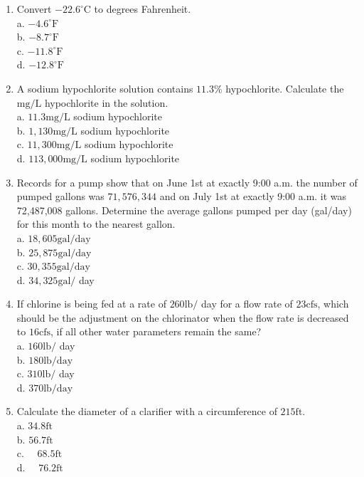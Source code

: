 \documentclass[10pt]{article}
\begin{document}
\begin{enumerate}
  \item Convert $-22.6^{\circ} \mathrm{C}$ to degrees Fahrenheit.\\
a. $-4.6^{\circ} \mathrm{F}$\\
b. $-8.7^{\circ} \mathrm{F}$\\
c. $-11.8^{\circ} \mathrm{F}$\\
d. $-12.8^{\circ} \mathrm{F}$

  \item A sodium hypochlorite solution contains $11.3 \%$ hypochlorite. Calculate the $\mathrm{mg} / \mathrm{L}$ hypochlorite in the solution.\\
a. $11.3 \mathrm{mg} / \mathrm{L}$ sodium hypochlorite\\
b. $1,130 \mathrm{mg} / \mathrm{L}$ sodium hypochlorite\\
c. $11,300 \mathrm{mg} / \mathrm{L}$ sodium hypochlorite\\
d. $113,000 \mathrm{mg} / \mathrm{L}$ sodium hypochlorite

  \item Records for a pump show that on June 1st at exactly 9:00 a.m. the number of pumped gallons was $71,576,344$ and on July 1st at exactly 9:00 a.m. it was 72,487,008 gallons. Determine the average gallons pumped per day (gal/day) for this month to the nearest gallon.\\
a. $18,605 \mathrm{gal} / \mathrm{day}$\\
b. $25,875 \mathrm{gal} / \mathrm{day}$\\
c. $30,355 \mathrm{gal} / \mathrm{day}$\\
d. $34,325 \mathrm{gal} /$ day 

\item If chlorine is being fed at a rate of $260 \mathrm{lb} /$ day for a flow rate of $23 \mathrm{cfs}$, which should be the adjustment on the chlorinator when the flow rate is decreased to $16 \mathrm{cfs}$, if all other water parameters remain the same?\\
a. $160 \mathrm{lb} /$ day\\
b. $180 \mathrm{lb} / \mathrm{day}$\\
c. $310 \mathrm{lb} /$ day\\
d. $370 \mathrm{lb} / \mathrm{day}$

  \item Calculate the diameter of a clarifier with a circumference of $215 \mathrm{ft}$.\\
a. $34.8 \mathrm{ft}$\\
b. $56.7 \mathrm{ft}$\\
c. $\quad 68.5 \mathrm{ft}$\\
d. $\quad 76.2 \mathrm{ft}$




\end{enumerate}
\end{document}
